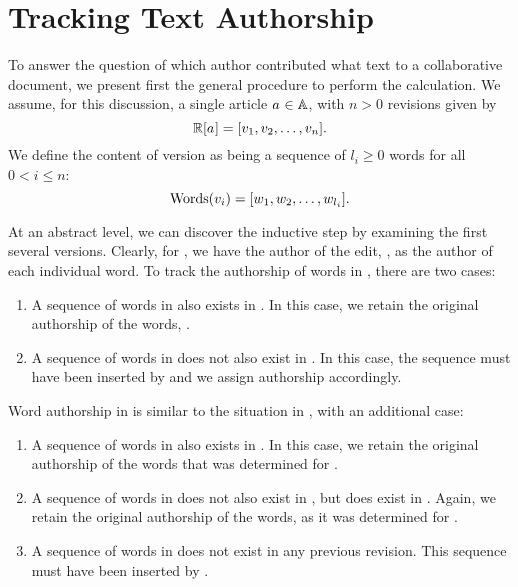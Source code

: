 \section{Tracking Text Authorship}

To answer the question of which author contributed what text to a
collaborative document, we present first the general procedure to
perform the calculation.
We assume, for this discussion, a single article $a_{} \in \mathbb{A}$,
with $n > 0$ revisions given by
\begin{equation*}
\revisions{\article{}} = [ \version{1}, \version{2}, \ldots, \version{n} ].
\end{equation*}
We define the content of version 
as being a sequence of $l_i \ge 0$ words for all $0 < i \le n$:
\begin{equation*}
\mathrm{Words}(v_{i}) = [ w_1, w_2, \ldots, w_{l_i} ].
\end{equation*}


At an abstract level, we can discover the inductive step by examining
the first several versions.
Clearly, for , we have the author of the edit,
, as the author of each individual word.
To track the authorship of words in , there are two cases:
\begin{enumerate}
\item A sequence of words in  also exists in .
	In this case, we retain the original authorship of the words,
	.
\item A sequence of words in  does not also exist in .
	In this case, the sequence must have been inserted by
	 and we assign authorship accordingly.
\end{enumerate}
Word authorship in  is similar to the situation in
, with an additional case:
\begin{enumerate}
\item A sequence of words in  also exists in .
	In this case, we retain the original authorship of the words
	that was determined for .
\item A sequence of words in  does not also exist in ,
	but does exist in .
	Again, we retain the original authorship of the words, as it was
	determined for .
\item A sequence of words in  does not exist in any previous
	revision.
	This sequence must have been inserted by .
\end{enumerate}

